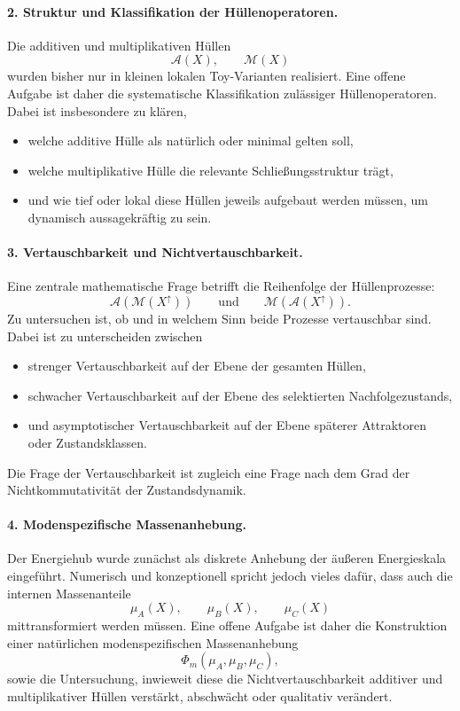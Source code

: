 \documentclass[11pt,a4paper]{article}
\theoremstyle{definition}
\begin{document}
\paragraph{2. Struktur und Klassifikation der Hüllenoperatoren.}
Die additiven und multiplikativen Hüllen
\[
\mathcal A(X),\qquad \mathcal M(X)
\]
wurden bisher nur in kleinen lokalen Toy-Varianten realisiert. Eine offene Aufgabe ist daher die systematische Klassifikation zulässiger Hüllenoperatoren. Dabei ist insbesondere zu klären,
\begin{itemize}
	\item welche additive Hülle als natürlich oder minimal gelten soll,
	\item welche multiplikative Hülle die relevante Schließungsstruktur trägt,
	\item und wie tief oder lokal diese Hüllen jeweils aufgebaut werden müssen, um dynamisch aussagekräftig zu sein.
\end{itemize}

\paragraph{3. Vertauschbarkeit und Nichtvertauschbarkeit.}
Eine zentrale mathematische Frage betrifft die Reihenfolge der Hüllenprozesse:
\[
\mathcal A(\mathcal M(X^\uparrow))
\qquad\text{und}\qquad
\mathcal M(\mathcal A(X^\uparrow)).
\]
Zu untersuchen ist, ob und in welchem Sinn beide Prozesse vertauschbar sind. Dabei ist zu unterscheiden zwischen
\begin{itemize}
	\item strenger Vertauschbarkeit auf der Ebene der gesamten Hüllen,
	\item schwacher Vertauschbarkeit auf der Ebene des selektierten Nachfolgezustands,
	\item und asymptotischer Vertauschbarkeit auf der Ebene späterer Attraktoren oder Zustandsklassen.
\end{itemize}
Die Frage der Vertauschbarkeit ist zugleich eine Frage nach dem Grad der Nichtkommutativität der Zustandsdynamik.

\paragraph{4. Modenspezifische Massenanhebung.}
Der Energiehub wurde zunächst als diskrete Anhebung der äußeren Energieskala eingeführt. Numerisch und konzeptionell spricht jedoch vieles dafür, dass auch die internen Massenanteile
\[
\mu_A(X),\qquad \mu_B(X),\qquad \mu_C(X)
\]
mittransformiert werden müssen. Eine offene Aufgabe ist daher die Konstruktion einer natürlichen modenspezifischen Massenanhebung
\[
\Phi_m(\mu_A,\mu_B,\mu_C),
\]
sowie die Untersuchung, inwieweit diese die Nichtvertauschbarkeit additiver und multiplikativer Hüllen verstärkt, abschwächt oder qualitativ verändert.
\end{document}
